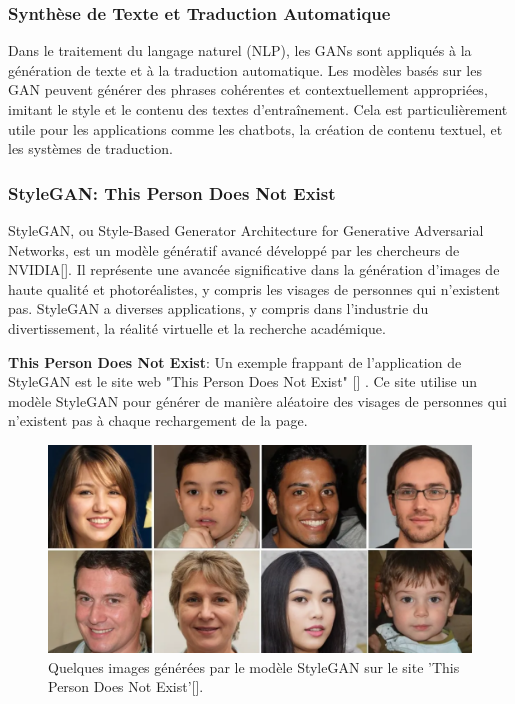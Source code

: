 \subsubsection{Synthèse de Texte et Traduction Automatique}

Dans le traitement du langage naturel (NLP), les GANs sont appliqués à la
génération de texte et à la traduction automatique. Les modèles basés sur les
GAN peuvent générer des phrases cohérentes et contextuellement appropriées,
imitant le style et le contenu des textes d'entraînement. Cela est
particulièrement utile pour les applications comme les chatbots, la création de
contenu textuel, et les systèmes de traduction.

\subsubsection{ StyleGAN: This Person Does Not Exist}

StyleGAN, ou Style-Based Generator Architecture for Generative Adversarial
Networks, est un modèle génératif avancé développé par les chercheurs de
NVIDIA[\cite{karras2019style}]. Il représente une avancée significative dans la
génération d'images de haute qualité et photoréalistes, y compris les visages
de personnes qui n'existent pas. StyleGAN a diverses applications, y compris
dans l'industrie du divertissement, la réalité virtuelle et la recherche
académique.

\textbf{This Person Does Not Exist}: Un exemple frappant de l'application de StyleGAN est le site web "This Person Does Not Exist" [\cite{thispersondoesnotexist}]  . Ce site utilise un modèle StyleGAN pour générer de manière aléatoire des visages de personnes qui n'existent pas à chaque rechargement de la page.

\begin{figure}[hbt!]
	\centering
	\includegraphics[width=12cm]{images_pfe/thisperson.png}
	\caption{Quelques images générées par le modèle StyleGAN sur le site 'This Person Does Not Exist'[\cite{thispersondoesnotexist}].}
	\label{fig:thisperson}
\end{figure}
\FloatBarrier

